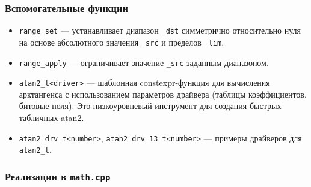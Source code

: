 \documentclass[a4paper,12pt]{article}
\begin{document}
\subsubsection{Вспомогательные функции}

\begin{itemize}
    \item \texttt{range\_set} — устанавливает диапазон \texttt{\_dst} симметрично относительно нуля на основе абсолютного значения \texttt{\_src} и пределов \texttt{\_lim}.
    \item \texttt{range\_apply} — ограничивает значение \texttt{\_src} заданным диапазоном.
    \item \texttt{atan2\_t<driver>} — шаблонная constexpr-функция для вычисления арктангенса с использованием параметров драйвера (таблицы коэффициентов, битовые поля). Это низкоуровневый инструмент для создания быстрых табличных atan2.
    \item \texttt{atan2\_drv\_t<number>}, \texttt{atan2\_drv\_13\_t<number>} — примеры драйверов для \texttt{atan2\_t}.
\end{itemize}

\subsubsection{Реализации в \texttt{math.cpp}}
\end{document}
